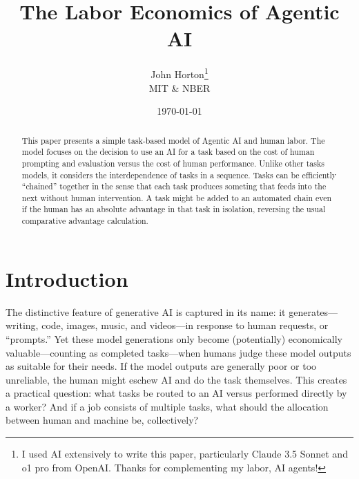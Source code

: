 \documentclass{article}
\begin{document}
\title{The Labor Economics of Agentic AI}
\author{John Horton\footnote{I used AI extensively to write this paper, particularly Claude 3.5 Sonnet and o1 pro from OpenAI. Thanks for complementing my labor, AI agents!}\\MIT \& NBER}
\date{\today{}}

\newcommand{\machine}[1]{\langle #1 \rangle}
\newcommand{\human}[1]{( #1 )}
\newcommand{\cost}[1]{C\{ #1 \}}
\newcommand{\costdo}[1]{C_H\{ #1 \}}
\newcommand{\costmanage}[1]{C_M\{ #1 \}}

\newcommand{\topic}[1]{\paragraph{#1}}

\maketitle

\begin{abstract}
\noindent This paper presents a simple task-based model of Agentic AI and human labor.
The model focuses on the decision to use an AI for a task based on the cost of human prompting and evaluation versus the cost of human performance. 
Unlike other tasks models, it considers the interdependence of tasks in a sequence. 
Tasks can be efficiently ``chained'' together in the sense that each task produces someting that feeds into the next without human intervention.
A task might be added to an automated chain even if the human has an absolute advantage in that task in isolation, reversing the usual comparative advantage calculation.
\end{abstract}

\onehalfspacing
  
\section{Introduction}
The distinctive feature of generative AI is captured in its name: it generates---writing, code, images, music, and videos---in response to human requests, or ``prompts.''
Yet these model generations only become (potentially) economically valuable---counting as completed tasks---when humans judge these model outputs as suitable for their needs.
If the model outputs are generally poor or too unreliable, the human might eschew AI and do the task themselves.
This creates a practical question: what tasks be routed to an AI versus performed directly by a worker?
And if a job consists of multiple tasks, what should the allocation between human and machine be, collectively? 
\end{document}
